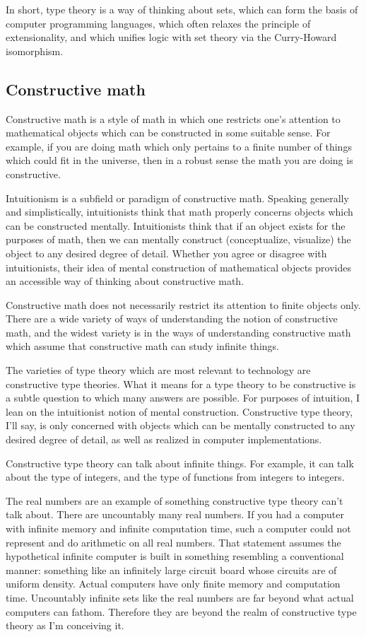 \documentclass{article}
\begin{document}
In short, type theory is a way of thinking about sets, which can form the basis of computer programming languages, which often relaxes the principle of extensionality, and which unifies logic with set theory via the Curry-Howard isomorphism.

\subsection{Constructive math}

Constructive math is a style of math in which one restricts one's attention to mathematical objects which can be constructed in some suitable sense. For example, if you are doing math which only pertains to a finite number of things which could fit in the universe, then in a robust sense the math you are doing is constructive.

Intuitionism is a subfield or paradigm of constructive math. Speaking generally and simplistically, intuitionists think that math properly concerns objects which can be constructed mentally. Intuitionists think that if an object exists for the purposes of math, then we can mentally construct (conceptualize, visualize) the object to any desired degree of detail. Whether you agree or disagree with intuitionists, their idea of mental construction of mathematical objects provides an accessible way of thinking about constructive math.

Constructive math does not necessarily restrict its attention to finite objects only. There are a wide variety of ways of understanding the notion of constructive math, and the widest variety is in the ways of understanding constructive math which assume that constructive math can study infinite things.

The varieties of type theory which are most relevant to technology are constructive type theories. What it means for a type theory to be constructive is a subtle question to which many answers are possible. For purposes of intuition, I lean on the intuitionist notion of mental construction. Constructive type theory, I'll say, is only concerned with objects which can be mentally constructed to any desired degree of detail, as well as realized in computer implementations.

Constructive type theory can talk about infinite things. For example, it can talk about the type of integers, and the type of functions from integers to integers.

The real numbers are an example of something constructive type theory can't talk about. There are uncountably many real numbers. If you had a computer with infinite memory and infinite computation time, such a computer could not represent and do arithmetic on all real numbers. That statement assumes the hypothetical infinite computer is built in something resembling a conventional manner: something like an infinitely large circuit board whose circuits are of uniform density. Actual computers have only finite memory and computation time. Uncountably infinite sets like the real numbers are far beyond what actual computers can fathom. Therefore they are beyond the realm of constructive type theory as I'm conceiving it.
\end{document}
